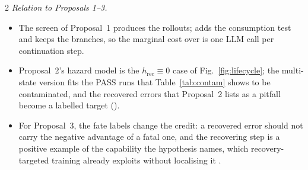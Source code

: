 \begin{multicols}{2}
\emph{Relation to Proposals 1--3.}
\begin{itemize}[leftmargin=1.1em]
\item The screen of Proposal~1 produces the rollouts;  adds the consumption test and keeps the branches, so the marginal cost over  is one LLM call per continuation step.
\item Proposal~2's hazard model is the $h_{\mathrm{rec}}\equiv0$ case of Fig.~\ref{fig:lifecycle}; the multi-state version fits the PASS runs that Table~\ref{tab:contam} shows to be contaminated, and the recovered errors that Proposal~2 lists as a pitfall become a labelled target ().
\item For Proposal~3, the fate labels change the credit: a recovered error should not carry the negative advantage of a fatal one, and the recovering step is a positive example of the capability the hypothesis names, which recovery-targeted training already exploits without localising it \cite{cuarecovery2026,reterm2026}.
\end{itemize}
\end{multicols}

